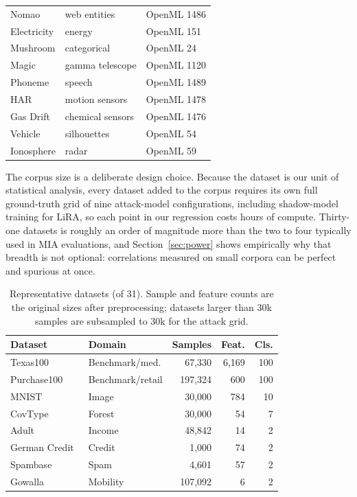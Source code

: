 \begin{table}[t]
\begin{tabular}{lll}
Nomao         & web entities         & OpenML 1486 \\
Electricity   & energy               & OpenML 151 \\
Mushroom      & categorical          & OpenML 24 \\
Magic         & gamma telescope      & OpenML 1120 \\
Phoneme       & speech               & OpenML 1489 \\
HAR           & motion sensors       & OpenML 1478 \\
Gas Drift     & chemical sensors     & OpenML 1476 \\
Vehicle       & silhouettes          & OpenML 54 \\
Ionosphere    & radar                & OpenML 59 \\
\bottomrule
\end{tabular}
\end{table}

The corpus size is a deliberate design choice. Because the dataset is our
unit of statistical analysis, every dataset added to the corpus requires
its own full ground-truth grid of nine attack-model configurations,
including shadow-model training for LiRA, so each point in our regression
costs hours of compute. Thirty-one datasets is roughly an order of
magnitude more than the two to four typically used in MIA evaluations,
and Section~\ref{sec:power} shows empirically why that breadth is not
optional: correlations measured on small corpora can be perfect and
spurious at once.

\begin{table}[t]
\centering
\caption{Representative datasets (of 31). Sample and feature counts are the
         original sizes after preprocessing; datasets larger than 30k
         samples are subsampled to 30k for the attack grid.}
\label{tab:datasets}
\small
\setlength{\tabcolsep}{2pt}
\begin{tabular}{llrrr}
\toprule
\textbf{Dataset} & \textbf{Domain} & \textbf{Samples} & \textbf{Feat.} & \textbf{Cls.} \\
\midrule
Texas100~\cite{shokri2017membership}    & Benchmark/med.  & 67,330 & 6,169 & 100 \\
Purchase100~\cite{shokri2017membership} & Benchmark/retail & 197,324 & 600 & 100 \\
MNIST~\cite{lecun1998gradient}  & Image       & 30,000 & 784 & 10 \\
CovType~\cite{blackard1999comparative} & Forest & 30,000 &  54 &  7 \\
Adult~\cite{adult1996}          & Income      & 48,842 & 14 & 2 \\
German Credit~\cite{dua2019uci} & Credit      &  1,000 & 74 & 2 \\
Spambase~\cite{dua2019uci}      & Spam        &  4,601 & 57 & 2 \\
Gowalla~\cite{cho2011friendship}& Mobility    & 107,092 &  6 & 2 \\
\bottomrule
\end{tabular}
\end{table}

